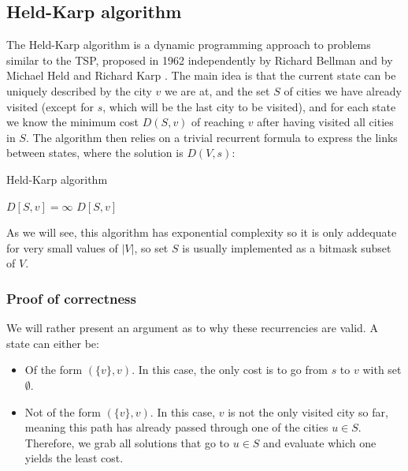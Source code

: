 \subsection{Held-Karp algorithm} \label{algorithm-tsp-heldkarp}
The Held-Karp algorithm is a dynamic programming approach to problems similar to the \acrlong*{TSP}, proposed in 1962 independently by Richard Bellman \cite{bellman62} and by Michael Held and Richard Karp \cite{held-karp62}. The main idea is that the current state can be uniquely described by the city $v$ we are at, and the set $S$ of cities we have already visited (except for $s$, which will be the last city to be visited), and for each state we know the minimum cost $D(S,v)$ of reaching $v$ after having visited all cities in $S$. The algorithm then relies on a trivial recurrent formula to express the links between states, where the solution is $D(V, s)$:
\begin{algorithm}[H]
    \caption{Held-Karp algorithm}
    \label{alg:held-karp}
    \begin{algorithmic}[1]
         {$D[S,v]=\infty$}
        \EndFor
             \Return $D[S,v]$
            \EndIf
              
            \EndIf
                 
            \EndFor
            \State {}
        \EndFunction
    \end{algorithmic}
\end{algorithm}
As we will see, this algorithm has exponential complexity so it is only addequate for very small values of $|V|$, so set $S$ is usually implemented as a bitmask subset of $V$.
\subsubsection{Proof of correctness}
We will rather present an argument as to why these recurrencies are valid. A state can either be:
\begin{itemize}
    \item Of the form $(\{v\}, v)$. In this case, the only cost is to go from $s$ to $v$ with set $\emptyset$.
    \item Not of the form $(\{v\}, v)$. In this case, $v$ is not the only visited city so far, meaning this path has already passed through one of the cities $u \in S$. Therefore, we grab all solutions that go to $u \in S$ and evaluate which one yields the least cost.
\end{itemize}

